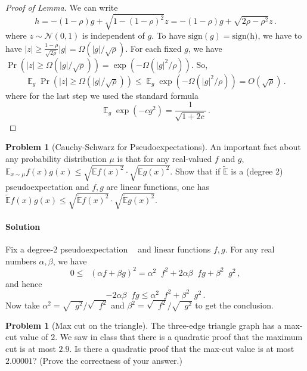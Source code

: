 \documentclass[11pt]{article}
\theoremstyle{definition}
\newtheorem{problem}[theorem]{Problem}
\newcommand{\cN}{\mathcal{N}}
\DeclareMathOperator{\E}{\mathbb{E}} %
\DeclareMathOperator{\pE}{\widetilde{\mathbb{E}}} %
\begin{document}
\begin{proof}[Proof of Lemma]
  We can write 
  \[
  h = -(1-\rho) g + \sqrt{1-(1-\rho)^2} z  = -(1-\rho) g + \sqrt{2\rho - \rho^2} z \, .
  \]
  where $z \sim \cN(0,1)$ is independent of $g$.
  To have $\text{sign}(g) = \text{sign(h)}$, we have to have $|z| \geq \frac{1-\rho}{\sqrt{2\rho}} |g| = \Omega(|g| / \sqrt{\rho})$.
  For each fixed $g$, we have $\Pr(|z| \geq \Omega(|g|/ \sqrt{\rho})) = \exp(- \Omega(|g|^2/\rho))$.
  So,
  \[
    \E_{g} \Pr(|z| \geq \Omega(|g|/\sqrt{\rho})) \leq \E_{g} \exp(-\Omega(|g|^2/\rho)) = O(\sqrt \rho) \, .
  \]
  where for the last step we used the standard formula
  \[
    \E_g \exp(- c g^2) = \frac 1{\sqrt{1+2c}} \, .
  \]
\end{proof}





\begin{problem}[Cauchy-Schwarz for Pseudoexpectations]
An important fact about any probability distribution $\mu$ is that for any real-valued $f$ and $g$, $\mathbb{E}_{x \sim \mu} f(x) g(x) \leq \sqrt{\mathbb{E} f(x)^2} \cdot \sqrt{ \mathbb{E} g(x)^2 }$. Show that if $\tilde{\mathbb{E}}$ is a (degree 2) pseudoexpectation and $f,g$ are linear functions, one has $\tilde{\mathbb{E}} f(x) g(x) \leq \sqrt{\tilde{\mathbb{E}} f(x)^2} \cdot \sqrt{\tilde{\mathbb{E}} g(x)^2}$.
\end{problem}

\paragraph{Solution}
Fix a degree-2 pseudoexpectation $\pE$ and linear functions $f,g$.
For any real numbers $\alpha,\beta$, we have
\[
  0 \leq \pE (\alpha f + \beta g)^2 = \alpha^2 \pE f^2 + 2 \alpha \beta \pE fg + \beta^2 \pE g^2 \, ,
\]
and hence
\[
   - 2 \alpha \beta \pE fg \leq \alpha^2 \pE f^2 + \beta^2 \pE g^2 \, .
\]
Now take $\alpha^2 = \sqrt{\pE g^2} / \sqrt{\pE f^2}$ and $\beta^2 = \sqrt{\pE f^2} / \sqrt{\pE g^2}$ to get the conclusion.

\begin{problem}[Max cut on the triangle]
  The three-edge triangle graph has a max-cut value of $2$.
  We saw in class that there is a quadratic proof that the maximum cut is at most $2.9$.
  Is there a quadratic proof that the max-cut value is at most $2.00001$?
  (Prove the correctness of your answer.)
\end{problem}
\end{document}
